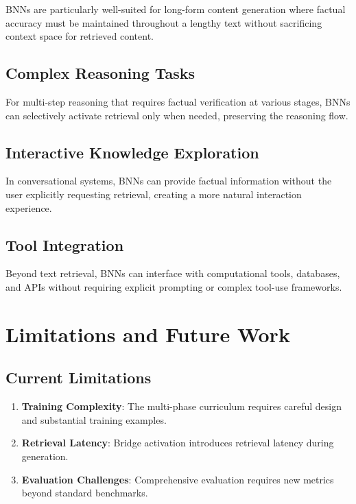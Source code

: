 \documentclass[9pt,a4paper,twocolumn,twoside]{tau-class/tau}
\begin{document}
    BNNs are particularly well-suited for long-form content generation where factual accuracy must be maintained throughout a lengthy text without sacrificing context space for retrieved content.

\subsection{Complex Reasoning Tasks}

    For multi-step reasoning that requires factual verification at various stages, BNNs can selectively activate retrieval only when needed, preserving the reasoning flow.

\subsection{Interactive Knowledge Exploration}

    In conversational systems, BNNs can provide factual information without the user explicitly requesting retrieval, creating a more natural interaction experience.

\subsection{Tool Integration}

    Beyond text retrieval, BNNs can interface with computational tools, databases, and APIs without requiring explicit prompting or complex tool-use frameworks.

\section{Limitations and Future Work}

\subsection{Current Limitations}

    \begin{enumerate}
        \item \textbf{Training Complexity}: The multi-phase curriculum requires careful design and substantial training examples.
        \item \textbf{Retrieval Latency}: Bridge activation introduces retrieval latency during generation.
        \item \textbf{Evaluation Challenges}: Comprehensive evaluation requires new metrics beyond standard benchmarks.
    \end{enumerate}
\end{document}
